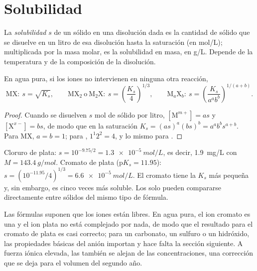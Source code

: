\section{Solubilidad}

\begin{definition}[Solubilidad]\label{def:b1:precipitation:solubility}
La \emph{solubilidad} $s$ de un sólido en una
disolución dada es la cantidad de sólido que se disuelve en un litro de
esa disolución hasta la saturación (en \unit{mol/L}); multiplicada por la
masa molar, es la solubilidad en masa, en \unit{g/L}. Depende de la
temperatura y de la composición de la disolución.
\end{definition}

\begin{proposition}\label{prop:b1:precipitation:s-of-ks}
En agua pura, si los iones no intervienen en ninguna otra reacción,
\[
  \mathrm{MX}:\ s = \sqrt{K_s}, \qquad
  \mathrm{MX_2}\ \text{o}\ \mathrm{M_2X}:\ s = \left(\frac{K_s}{4}\right)^{1/3},
  \qquad
  \mathrm{M}_a\mathrm{X}_b:\ s = \left(\frac{K_s}{a^a b^b}\right)^{1/(a+b)} .
\]
\end{proposition}

\begin{proof}
Cuando se disuelven $s$ mol de sólido por litro, $[\mathrm{M}^{m+}] = as$
y $[\mathrm{X}^{x-}] = bs$, de modo que en la saturación $K_s = (as)^a(bs)^b =
a^a b^b s^{a+b}$. Para MX, $a = b = 1$; para , $1^1 2^2 = 4$, y lo
mismo para .
\end{proof}

\begin{example}\label{ex:b1:precipitation:agcl-ag2cro4}
Cloruro de plata: $s = 10^{-9.75/2} = \qty{1.3e-5}{mol/L}$, es decir,
\qty{1.9}{mg/L} con $M = \qty{143.4}{g/mol}$. Cromato de plata
($\mathrm{p}K_s = 11.95$): $s = (10^{-11.95}/4)^{1/3} =
\qty{6.6e-5}{mol/L}$. El cromato tiene la $K_s$ más pequeña y, sin
embargo, es cinco veces más soluble. Los  solo
pueden compararse directamente entre sólidos del mismo tipo de fórmula.
\end{example}

\begin{remark}
Las fórmulas suponen que los iones están libres. En agua pura, el ion
cromato es una  y el ion plata no está complejado por nada, de
modo que el resultado para el cromato de plata es casi correcto; para un
carbonato, un sulfuro o un hidróxido, las propiedades básicas del anión
importan y hace falta la sección siguiente. A fuerza iónica elevada, las
 también se alejan de las concentraciones, una corrección que
se deja para el volumen del segundo año.
\end{remark}

